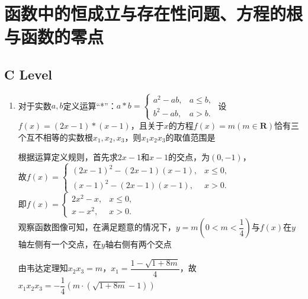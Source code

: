 \section*{函数中的恒成立与存在性问题、方程的根与函数的零点}
\subsection*{C Level}
\begin{enumerate}
    \item 对于实数$a, b$定义运算“*”：$a*b = \left\{  
         \begin{array}{ll}  
            a^2 - ab, & a \leq b, \\  
            b^2 - ab, & a > b.
         \end{array}
    \right.$ 设$f(x) = (2x-1) * (x-1)$，且关于$x$的方程$f(x) = m (m \in \mathbf{R})$恰有三个互不相等的实数根$x_1, x_2, x_3$，则$x_1x_2x_3$的取值范围是
    \begin{jieda}
        根据运算定义规则，首先求$2x-1$和$x-1$的交点，为$(0, -1)$，\\
        故$f(x) = \left\{ 
                 \begin{array}{ll}  
                    (2x-1)^2 - (2x-1)(x-1), & x \leq 0, \\  
                    (x-1)^2 - (2x-1)(x-1), & x > 0.
                 \end{array}
                \right. $ \\
        即$f(x) = \left\{ 
                 \begin{array}{ll}  
                    2x^2-x, & x \leq 0, \\  
                    x-x^2, & x > 0.
                 \end{array}
                \right. $ \\
        观察函数图像可知，在满足题意的情况下，$y = m \left(0 < m < \dfrac{1}{4}\right)$与$f(x)$在$y$轴左侧有一个交点，在$y$轴右侧有两个交点
        
        由韦达定理知$x_2x_3 = m$，$x_1 = \dfrac{1-\sqrt{1+8m}}{4}$，故$x_1x_2x_3 = -\dfrac{1}{4}(m \cdot (\sqrt{1+8m} - 1))$
        

\end{jieda}
\end{enumerate}
